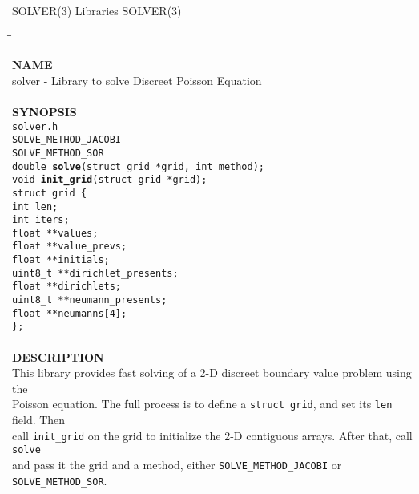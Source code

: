 \begin{flushleft}
	SOLVER(3)
	\hfill Libraries \hfill
	SOLVER(3)
\end{flushleft}

\begin{tabbing}
\hspace{30pt}\=\hspace{30pt}\=\kill

\textbf{NAME}\\
\> solver - Library to solve Discreet Poisson Equation\\
\\
\textbf{SYNOPSIS}\\
	\> \texttt{solver.h}\\
	\> \> \texttt{SOLVE\_METHOD\_JACOBI}\\
	\> \> \texttt{SOLVE\_METHOD\_SOR}\\
	\> \texttt{double \textbf{solve}(struct grid *grid, int method);}\\
	\> \texttt{void \textbf{init\_grid}(struct grid *grid);}\\
	\> \texttt{struct grid \{}\\
	\> \> \texttt{int len;}\\
	\> \> \texttt{int iters;}\\
	\> \> \texttt{float **values;}\\
	\> \> \texttt{float **value\_prevs;}\\
	\> \> \texttt{float **initials;}\\
	\> \> \texttt{uint8\_t **dirichlet\_presents;}\\
	\> \> \texttt{float **dirichlets;}\\
	\> \> \texttt{uint8\_t **neumann\_presents;}\\
	\> \> \texttt{float **neumanns[4];}\\
	\>\texttt{\};}\\
\\
\textbf{DESCRIPTION}\\
\> This library provides fast solving of a 2-D discreet boundary value problem using the\\
	\> Poisson equation. The full process is to define a \texttt{struct grid}, and set its \texttt{len} field. Then\\
	\> call \texttt{init\_grid} on the grid to initialize the 2-D contiguous arrays. After that, call \texttt{solve}\\
	\> and pass it the grid and a method, either \texttt{SOLVE\_METHOD\_JACOBI} or \texttt{SOLVE\_METHOD\_SOR}.\\

\end{tabbing}
